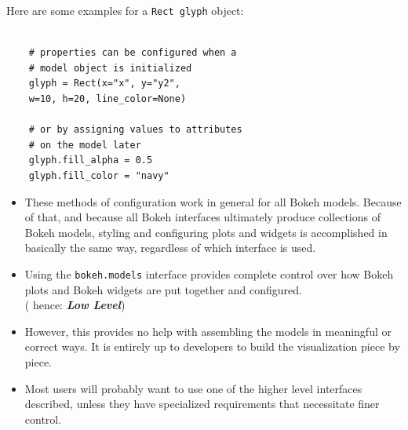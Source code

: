 \documentclass[a4paper,12pt]{article}
\begin{document}
Here are some examples for a \texttt{Rect glyph} object:

\begin{framed}
	\begin{verbatim}
	
	# properties can be configured when a 
	# model object is initialized
	glyph = Rect(x="x", y="y2", 
	w=10, h=20, line_color=None)
	
	# or by assigning values to attributes
	# on the model later
	glyph.fill_alpha = 0.5
	glyph.fill_color = "navy"
	\end{verbatim}
\end{framed}
\newpage
\begin{itemize}
	\item These methods of configuration work in general for all Bokeh models. Because of that, and because all Bokeh interfaces ultimately produce collections of Bokeh models, styling and configuring plots and widgets is accomplished in basically the same way, regardless of which interface is used.
	
	\item Using the \texttt{bokeh.models} interface provides complete control over how Bokeh plots and Bokeh widgets are put together and configured.\\ ( hence:  \textbf{\textit{Low Level}}) 
	\item However, this provides no help with assembling the models in meaningful or correct ways. It is entirely up to developers to build the visualization piece by piece.
	
	\item Most users will probably want to use one of the higher level interfaces described, unless they have specialized requirements that necessitate finer control. 
\end{itemize}
\newpage
\end{document}
